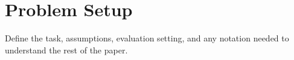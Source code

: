 \section{Problem Setup}

Define the task, assumptions, evaluation setting, and any notation needed to understand the rest of the paper.
